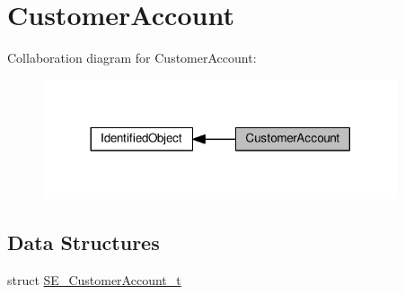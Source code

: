 \hypertarget{group__CustomerAccount}{}\section{Customer\+Account}
\label{group__CustomerAccount}
Collaboration diagram for Customer\+Account\+:\nopagebreak
\begin{figure}[H]
\begin{center}
\leavevmode
\includegraphics[width=296pt]{group__CustomerAccount}
\end{center}
\end{figure}
\subsection*{Data Structures}
\begin{DoxyCompactItemize}
\item 
struct \hyperlink{structSE__CustomerAccount__t}{S\+E\+\_\+\+Customer\+Account\+\_\+t}
\end{DoxyCompactItemize}
